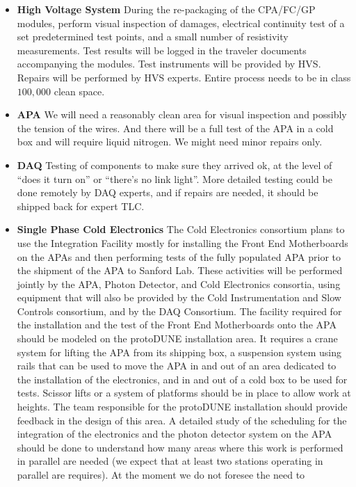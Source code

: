 \begin{itemize}
  \item {\bf High Voltage System} During the re-packaging of the CPA/FC/GP modules, perform 
visual inspection of damages, electrical continuity test of a set predetermined test points, and a 
small number of resistivity measurements.  Test results will be logged in the traveler documents 
accompanying the modules.  Test instruments will be provided by HVS.  Repairs will be performed 
by HVS experts. Entire process needs to be in class $100,000$ clean space. 
  \item {\bf APA} We will need a reasonably clean area for visual inspection and possibly the tension 
of the wires.  And there will be a full test of the APA in a cold box and will require liquid nitrogen.
We might need minor repairs only.
  \item {\bf DAQ} Testing of components to make sure they arrived ok, at the level of ``does it turn on'' or ``there’s no link light''.  More detailed testing could be done remotely by DAQ experts, and if repairs are needed, it should be shipped back for expert TLC.
  \item {\bf Single Phase Cold Electronics} The Cold Electronics consortium plans to use 
the Integration Facility mostly for installing the Front End Motherboards on the APAs and then 
performing tests of the fully populated APA prior to the shipment of the APA to Sanford Lab. These 
activities will be performed jointly by the APA, Photon Detector, and Cold Electronics consortia, 
using equipment that will also be provided by the Cold Instrumentation and Slow Controls 
consortium, and by the DAQ Consortium. The facility required for the installation and the test of the 
Front End Motherboards onto the APA should be modeled on the protoDUNE installation area. It 
requires a crane system for lifting the APA from its shipping box, a suspension system using rails 
that can be used to move the APA in and out of an area dedicated to the installation of the 
electronics, and in and out of a cold box to be used for tests. Scissor lifts or a system of platforms 
should be in place to allow work at heights. The team responsible for the protoDUNE installation 
should provide feedback in the design of this area. A detailed study of the scheduling for the 
integration of the electronics and the photon detector system on the APA should be done to 
understand how many areas where this work is performed in parallel are needed (we expect that at 
least two stations operating in parallel are requires). At the moment we do not foresee the need to 

\end{itemize}
